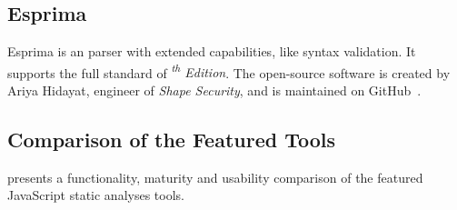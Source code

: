 \subsection{Esprima}

Esprima is an \es parser with extended capabilities, like syntax validation. It supports the full standard of \emph{\textsuperscript{th} Edition}. The open-source software is created by Ariya Hidayat, engineer of \emph{Shape Security}, and is maintained on GitHub~\cite{esprima-github}.


\subsection{Comparison of the Featured Tools}

 presents a functionality, maturity and usability comparison of the featured JavaScript static analyses tools.

